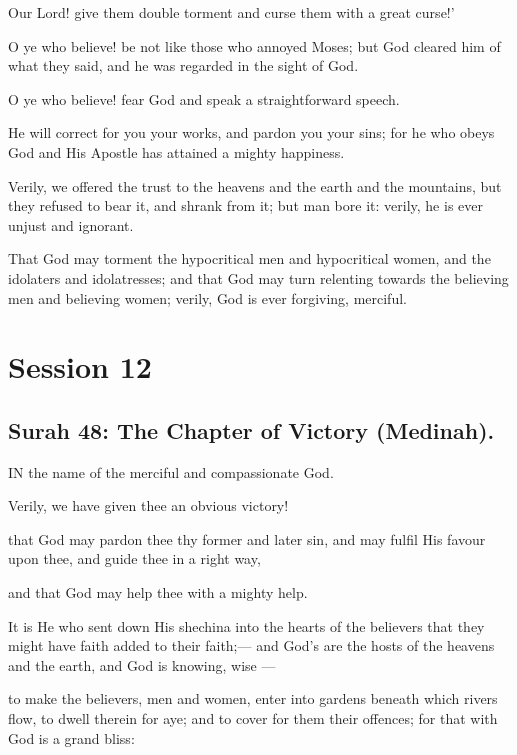 \documentclass[fontsize=14pt, letterpaper, notitlepage, openany, DIV=12]{scrbook} %
\begin{document}
\noindent[33:68]
Our Lord! give them double torment and curse them with a great curse!'

\noindent[33:69]
O ye who believe! be not like those who annoyed Moses; but God cleared him of what
they said, and he was regarded in the sight of God.

\noindent[33:70]
O ye who believe! fear God and speak a straightforward speech.

\noindent[33:71]
He will correct for you your works, and pardon you your sins; for he who obeys God and
His Apostle has attained a mighty happiness.

\noindent[33:72]
Verily, we offered the trust to the heavens and the earth and the mountains, but they
refused to bear it, and shrank from it; but man bore it: verily, he is ever unjust and ignorant.

\noindent[33:73]
That God may torment the hypocritical men and hypocritical women, and the idolaters
and idolatresses; and that God may turn relenting towards the believing men and believing
women; verily, God is ever forgiving, merciful.

\clearpage
\chapter{Session 12}


\section{Surah 48: The Chapter of Victory (Medinah).}


IN the name of the merciful and compassionate God.

\noindent[48:1]
Verily, we have given thee an obvious victory!

\noindent[48:2]
that God may pardon thee thy former and later sin, and may fulfil His favour upon thee,
and guide thee in a right way,

\noindent[48:3]
and that God may help thee with a mighty help.

\noindent[48:4]
It is He who sent down His shechina into the hearts of the believers that they might have
faith added to their faith;--- and God's are the hosts of the heavens and the earth, and God is
knowing, wise ---

\noindent[48:5]
to make the believers, men and women, enter into gardens beneath which rivers flow, to
dwell therein for aye; and to cover for them their offences; for that with God is a grand bliss:
\end{document}
